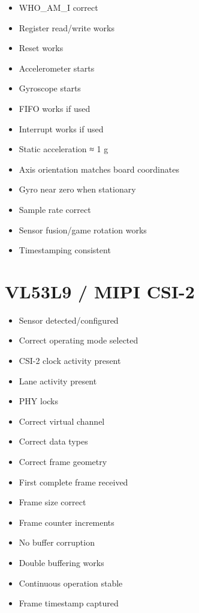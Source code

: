 \documentclass[10pt,a4paper,oneside]{report}
\providecommand{\tightlist}{\setlength{\itemsep}{1pt}\setlength{\parskip}{1pt}}
\begin{document}
\begin{itemize}
\tightlist
\item[$\square$]
  WHO\_AM\_I correct
\item[$\square$]
  Register read/write works
\item[$\square$]
  Reset works
\item[$\square$]
  Accelerometer starts
\item[$\square$]
  Gyroscope starts
\item[$\square$]
  FIFO works if used
\item[$\square$]
  Interrupt works if used
\item[$\square$]
  Static acceleration ≈ 1 g
\item[$\square$]
  Axis orientation matches board coordinates
\item[$\square$]
  Gyro near zero when stationary
\item[$\square$]
  Sample rate correct
\item[$\square$]
  Sensor fusion/game rotation works
\item[$\square$]
  Timestamping consistent
\end{itemize}

\section{VL53L9 / MIPI CSI-2}\label{wiki-hardware-bring-up-and-testing--16-vl53l9--mipi-csi-2}

\begin{itemize}
\tightlist
\item[$\square$]
  Sensor detected/configured
\item[$\square$]
  Correct operating mode selected
\item[$\square$]
  CSI-2 clock activity present
\item[$\square$]
  Lane activity present
\item[$\square$]
  PHY locks
\item[$\square$]
  Correct virtual channel
\item[$\square$]
  Correct data types
\item[$\square$]
  Correct frame geometry
\item[$\square$]
  First complete frame received
\item[$\square$]
  Frame size correct
\item[$\square$]
  Frame counter increments
\item[$\square$]
  No buffer corruption
\item[$\square$]
  Double buffering works
\item[$\square$]
  Continuous operation stable
\item[$\square$]
  Frame timestamp captured
\end{itemize}
\end{document}
